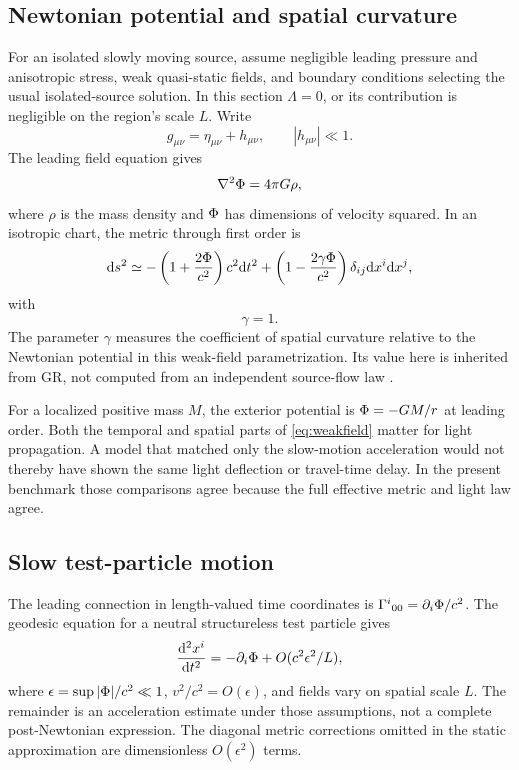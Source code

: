 \documentclass[11pt]{article}
\begin{document}
\subsection{Newtonian potential and spatial curvature}
For an isolated slowly moving source, assume negligible leading pressure and anisotropic stress, weak quasi-static fields, and boundary conditions selecting the usual isolated-source solution. In this section $\Lambda=0$, or its contribution is negligible on the region's scale $L$. Write
\begin{equation}
g_{\mu\nu}=\eta_{\mu\nu}+h_{\mu\nu},\qquad |h_{\mu\nu}|\ll1.
\label{eq:linearizedmetric}
\end{equation}
The leading field equation gives
\begin{equation}
\nabla^2\Phi=4\pi G\rho,
\label{eq:poisson}
\end{equation}
where $\rho$ is the mass density and $\Phi$ has dimensions of velocity squared. In an isotropic chart, the metric through first order is
\begin{equation}
\mathrm d s^2\simeq-\left(1+\frac{2\Phi}{c^2}\right)c^2\mathrm d t^2+
\left(1-\frac{2\gamma\Phi}{c^2}\right)\delta_{ij}\mathrm d x^i\mathrm d x^j,
\label{eq:weakfield}
\end{equation}
with
\begin{equation}
\gamma=1.
\label{eq:ppngamma}
\end{equation}
The parameter $\gamma$ measures the coefficient of spatial curvature relative to the Newtonian potential in this weak-field parametrization. Its value here is inherited from GR, not computed from an independent source-flow law \parencite{Carroll1997}.

For a localized positive mass $M$, the exterior potential is $\Phi=-GM/r$ at leading order. Both the temporal and spatial parts of \eqref{eq:weakfield} matter for light propagation. A model that matched only the slow-motion acceleration would not thereby have shown the same light deflection or travel-time delay. In the present benchmark those comparisons agree because the full effective metric and light law agree.

\subsection{Slow test-particle motion}
The leading connection in length-valued time coordinates is $\Gamma^i{}_{00}=\partial_i\Phi/c^2$. The geodesic equation for a neutral structureless test particle gives
\begin{equation}
\frac{\mathrm d^2x^i}{\mathrm d t^2}=-\partial_i\Phi+O(c^2\epsilon^2/L),
\label{eq:newtonianlimit}
\end{equation}
where $\epsilon=\sup|\Phi|/c^2\ll1$, $v^2/c^2=O(\epsilon)$, and fields vary on spatial scale $L$. The remainder is an acceleration estimate under those assumptions, not a complete post-Newtonian expression. The diagonal metric corrections omitted in the static approximation are dimensionless $O(\epsilon^2)$ terms.
\end{document}
